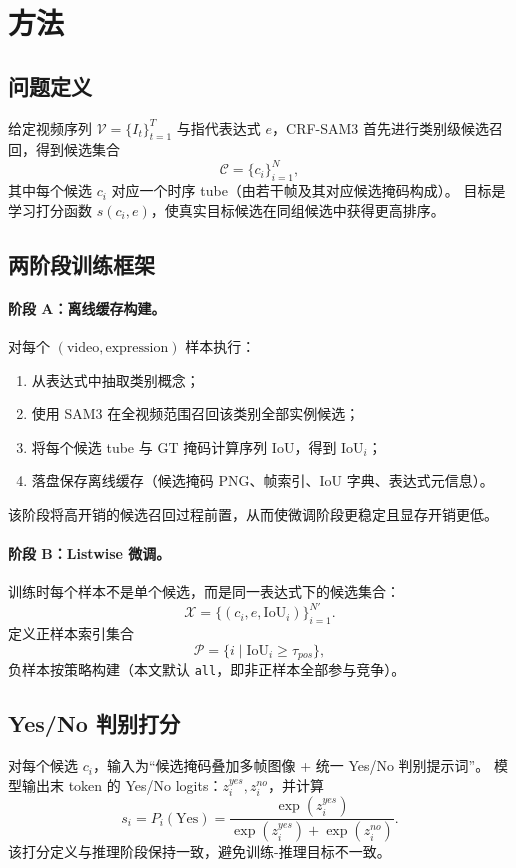 \section{方法}

\subsection{问题定义}
给定视频序列 $\mathcal{V}=\{I_t\}_{t=1}^{T}$ 与指代表达式 $e$，CRF-SAM3 首先进行类别级候选召回，得到候选集合
\[
\mathcal{C}=\{c_i\}_{i=1}^{N},
\]
其中每个候选 $c_i$ 对应一个时序 tube（由若干帧及其对应候选掩码构成）。
目标是学习打分函数 $s(c_i,e)$，使真实目标候选在同组候选中获得更高排序。

\subsection{两阶段训练框架}
\paragraph{阶段 A：离线缓存构建。}
对每个 $(\text{video},\text{expression})$ 样本执行：
\begin{enumerate}
\item 从表达式中抽取类别概念；
\item 使用 SAM3 在全视频范围召回该类别全部实例候选；
\item 将每个候选 tube 与 GT 掩码计算序列 IoU，得到 $\text{IoU}_i$；
\item 落盘保存离线缓存（候选掩码 PNG、帧索引、IoU 字典、表达式元信息）。
\end{enumerate}
该阶段将高开销的候选召回过程前置，从而使微调阶段更稳定且显存开销更低。

\paragraph{阶段 B：Listwise 微调。}
训练时每个样本不是单个候选，而是同一表达式下的候选集合：
\[
\mathcal{X}=\{(c_i,e,\text{IoU}_i)\}_{i=1}^{N'}.
\]
定义正样本索引集合
\[
\mathcal{P}=\{i\mid \text{IoU}_i\ge \tau_{pos}\},
\]
负样本按策略构建（本文默认 \texttt{all}，即非正样本全部参与竞争）。

\subsection{Yes/No 判别打分}
对每个候选 $c_i$，输入为“候选掩码叠加多帧图像 + 统一 Yes/No 判别提示词”。
模型输出末 token 的 Yes/No logits：$z_i^{yes}, z_i^{no}$，并计算
\[
s_i=P_i(\text{Yes})=\frac{\exp(z_i^{yes})}{\exp(z_i^{yes})+\exp(z_i^{no})}.
\]
该打分定义与推理阶段保持一致，避免训练-推理目标不一致。

